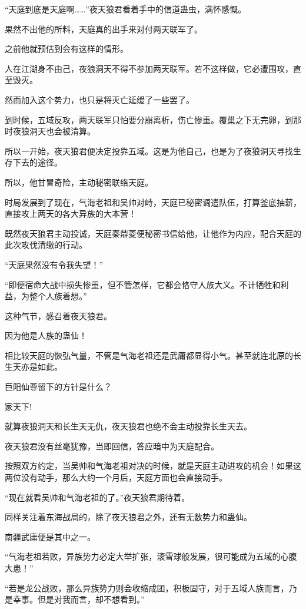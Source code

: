 
\begin{this_body}

“天庭到底是天庭啊……”夜天狼君看着手中的信道蛊虫，满怀感慨。

果然不出他的所料，天庭真的出手来对付两天联军了。

之前他就预估到会有这样的情形。

人在江湖身不由己，夜狼洞天不得不参加两天联军。若不这样做，它必遭围攻，直至毁灭。

然而加入这个势力，也只是将灭亡延缓了一些罢了。

到时候，五域反攻，两天联军只怕要分崩离析，伤亡惨重。覆巢之下无完卵，到那时夜狼洞天也会被清算。

所以一开始，夜天狼君便决定投靠五域。这是为他自己，也是为了夜狼洞天寻找生存下去的途径。

所以，他甘冒奇险，主动秘密联络天庭。

时局发展到了现在，气海老祖和吴帅对峙，天庭已秘密调遣队伍，打算釜底抽薪，直接攻上两天的各大异族的大本营！

既然夜天狼君主动投诚，天庭秦鼎菱便秘密书信给他，让他作为内应，配合天庭的此次攻伐清缴的行动。

“天庭果然没有令我失望！”

“即便宿命大战中损失惨重，但不管怎样，它都会恪守人族大义。不计牺牲和利益，为整个人族着想。”

这种气节，感召着夜天狼君。

因为他是人族的蛊仙！

相比较天庭的恢弘气量，不管是气海老祖还是武庸都显得小气。甚至就连北原的长生天亦是如此。

巨阳仙尊留下的方针是什么？

家天下!

就算夜狼洞天和长生天无仇，夜天狼君也绝不会主动投靠长生天去。

夜天狼君没有丝毫犹豫，当即回信，答应暗中为天庭配合。

按照双方约定，当吴帅和气海老祖对决的时候，就是天庭主动进攻的机会！如果这两位没有动手，那么大约一个月后，天庭方面也会直接动手。

“现在就看吴帅和气海老祖的了。”夜天狼君期待着。

同样关注着东海战局的，除了夜天狼君之外，还有无数势力和蛊仙。

南疆武庸便是其中之一。

“气海老祖若败，异族势力必定大举扩张，滚雪球般发展，很可能成为五域的心腹大患！”

“若是龙公战败，那么异族势力则会收缩成团，积极固守，对于五域人族而言，乃是幸事。但是对我而言，却不想看到。”


\end{this_body}

